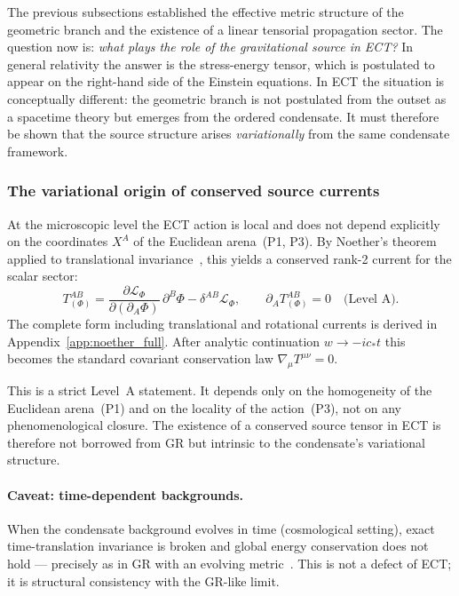 \medskip
The previous subsections established the effective metric structure of
the geometric branch and the existence of a linear tensorial propagation
sector.
The question now is: \emph{what plays the role of the gravitational
source in ECT?}
In general relativity the answer is the stress-energy tensor, which is
postulated to appear on the right-hand side of the Einstein equations.
In ECT the situation is conceptually different: the geometric branch is
not postulated from the outset as a spacetime theory but emerges from
the ordered condensate.
It must therefore be shown that the source structure arises
\emph{variationally} from the same condensate framework.

\subsubsection*{The variational origin of conserved source currents}

At the microscopic level the ECT action is local and does not depend
explicitly on the coordinates $X^A$ of the Euclidean arena~(P1, P3).
By Noether's theorem applied to translational invariance~\cite{Noether1918},
this yields a conserved rank-2 current for the scalar sector:
\begin{equation}
  \label{eq:Tab_Phi}
  T^{AB}_{(\Phi)}
  = \frac{\partial\mathcal{L}_\Phi}{\partial(\partial_A\Phi)}\,
    \partial^B\Phi - \delta^{AB}\mathcal{L}_\Phi,
  \qquad
  \partial_A T^{AB}_{(\Phi)} = 0
  \quad\text{(Level~A)}.
\end{equation}
The complete form including translational and rotational currents
is derived in Appendix~\ref{app:noether_full}.
After analytic continuation $w\to-ic_*t$ this becomes the standard
covariant conservation law $\nabla_\mu T^{\mu\nu}=0$.

This is a strict Level~A statement.
It depends only on the homogeneity of the Euclidean arena~(P1) and on
the locality of the action~(P3), not on any phenomenological closure.
The existence of a conserved source tensor in ECT is therefore not
borrowed from GR but intrinsic to the condensate's variational structure.

\paragraph{Caveat: time-dependent backgrounds.}
When the condensate background evolves in time (cosmological setting),
exact time-translation invariance is broken and global energy
conservation does not hold --- precisely as in GR with an evolving
metric~\cite{Weinberg1972}.
This is not a defect of ECT; it is structural consistency with the
GR-like limit.

